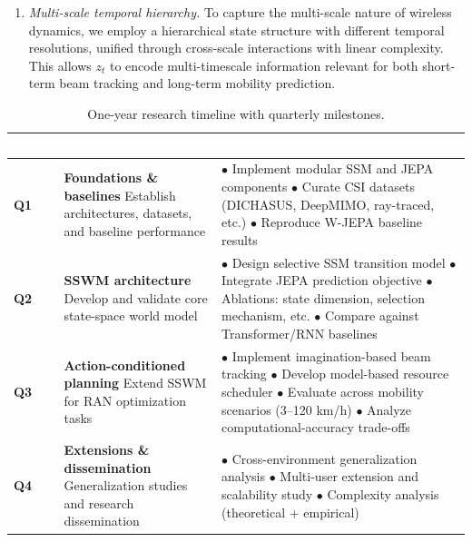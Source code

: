 \documentclass[11pt,a4paper]{article}
\begin{document}
\begin{enumerate}
    \item \textit{Multi-scale temporal hierarchy.} To capture the multi-scale nature of wireless dynamics, we employ a hierarchical state structure with different temporal resolutions, unified through cross-scale interactions with linear complexity. This allows $z_t$ to encode multi-timescale information relevant for both short-term beam tracking and long-term mobility prediction.
\end{enumerate}

\begin{table}[t]
\centering
\small
\begin{tabular}{|>{}C{1cm}|L{5cm}|L{8.6cm}|}
\hline
{}
\textcolor{white}{\textbf{Phase}} & \textcolor{white}{\textbf{Research objectives}} & \textcolor{white}{\textbf{Key activities}} \\
\hline
\textbf{Q1} & \textbf{Foundations \& baselines} \newline Establish architectures, datasets, and baseline performance & 
$\bullet$ Implement modular SSM and JEPA components \newline
$\bullet$ Curate CSI datasets (DICHASUS, DeepMIMO, ray-traced, etc.) \newline
$\bullet$ Reproduce W-JEPA baseline results \\
\hline
\textbf{Q2} & \textbf{SSWM architecture} \newline Develop and validate core state-space world model & 
$\bullet$ Design selective SSM transition model \newline
$\bullet$ Integrate JEPA prediction objective \newline
$\bullet$ Ablations: state dimension, selection mechanism, etc. \newline
$\bullet$ Compare against Transformer/RNN baselines \\
\hline
\textbf{Q3} & \textbf{Action-conditioned planning} \newline Extend SSWM for RAN optimization tasks & 
$\bullet$ Implement imagination-based beam tracking \newline
$\bullet$ Develop model-based resource scheduler \newline
$\bullet$ Evaluate across mobility scenarios (3--120 km/h) \newline
$\bullet$ Analyze computational-accuracy trade-offs \\
\hline
\textbf{Q4} & \textbf{Extensions \& dissemination} \newline Generalization studies and research dissemination & 
$\bullet$ Cross-environment generalization analysis \newline
$\bullet$ Multi-user extension and scalability study \newline
$\bullet$ Complexity analysis (theoretical + empirical) \\
\hline
\end{tabular}
\caption{One-year research timeline with quarterly milestones.}
\label{tab:timeline}
\end{table}
\end{document}

